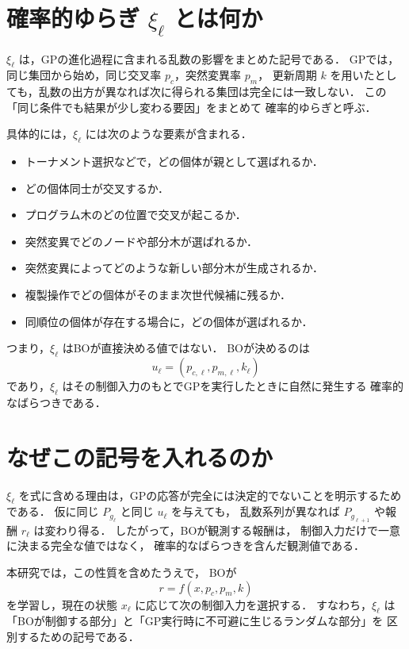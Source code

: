 \documentclass[a4paper,11pt]{ltjsarticle}
\begin{document}
\section{\texorpdfstring{確率的ゆらぎ \(\xi_\ell\) とは何か}{確率的ゆらぎ xi ell とは何か}}

\(\xi_\ell\) は，GPの進化過程に含まれる乱数の影響をまとめた記号である．
GPでは，同じ集団から始め，同じ交叉率 \(p_c\)，突然変異率 \(p_m\)，
更新周期 \(k\) を用いたとしても，乱数の出方が異なれば次に得られる集団は完全には一致しない．
この「同じ条件でも結果が少し変わる要因」をまとめて
確率的ゆらぎと呼ぶ．

具体的には，\(\xi_\ell\) には次のような要素が含まれる．

\begin{itemize}
  \item トーナメント選択などで，どの個体が親として選ばれるか．
  \item どの個体同士が交叉するか．
  \item プログラム木のどの位置で交叉が起こるか．
  \item 突然変異でどのノードや部分木が選ばれるか．
  \item 突然変異によってどのような新しい部分木が生成されるか．
  \item 複製操作でどの個体がそのまま次世代候補に残るか．
  \item 同順位の個体が存在する場合に，どの個体が選ばれるか．
\end{itemize}

つまり，\(\xi_\ell\) はBOが直接決める値ではない．
BOが決めるのは
\[
u_\ell=(p_{c,\ell},p_{m,\ell},k_\ell)
\]
であり，\(\xi_\ell\) はその制御入力のもとでGPを実行したときに自然に発生する
確率的なばらつきである．

\section{なぜこの記号を入れるのか}

\(\xi_\ell\) を式に含める理由は，GPの応答が完全には決定的でないことを明示するためである．
仮に同じ \(P_{g_\ell}\) と同じ \(u_\ell\) を与えても，
乱数系列が異なれば \(P_{g_{\ell+1}}\) や報酬 \(r_\ell\) は変わり得る．
したがって，BOが観測する報酬は，
制御入力だけで一意に決まる完全な値ではなく，
確率的なばらつきを含んだ観測値である．

本研究では，この性質を含めたうえで，
BOが
\[
r=f(x,p_c,p_m,k)
\]
を学習し，現在の状態 \(x_\ell\) に応じて次の制御入力を選択する．
すなわち，\(\xi_\ell\) は
「BOが制御する部分」と「GP実行時に不可避に生じるランダムな部分」を
区別するための記号である．
\end{document}
